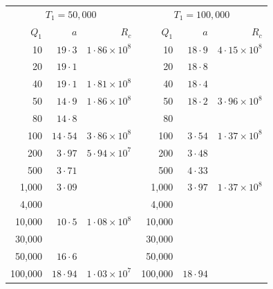 \begin{table}[p]
\bigskip
\begin{tabular}{r@{\quad}r@{\quad}r|r@{\quad}r@{\quad}r}
\hline
\multicolumn{3}{c|}{$T_1 = 50{,}000$} & \multicolumn{3}{c}{$T_1 = 100{,}000$} \\
$Q_1$ & $a$ & $R_c$ & $Q_1$ & $a$ & $R_c$ \\
\hline
 10   & $19{\cdot}3$ & $1{\cdot}86\times10^{8}$ & 10   & $18{\cdot}9$ & $4{\cdot}15\times10^{8}$\\
 20   & $19{\cdot}1$ &                          & 20   & $18{\cdot}8$ &           \\
 40   & $19{\cdot}1$ & $1{\cdot}81\times10^{8}$ & 40   & $18{\cdot}4$ &           \\
 50   & $14{\cdot}9$  & $1{\cdot}86\times10^{8}$& 50   & $18{\cdot}2$ & $3{\cdot}96\times10^{8}$\\
 80   & $14{\cdot}8$  &                         & 80   &              &           \\
 100  & $14{\cdot}54$ & $3{\cdot}86\times10^{8}$& 100  & $3{\cdot}54$ & $1{\cdot}37\times10^{8}$\\
 200  & $3{\cdot}97$ & $5{\cdot}94\times10^{7}$ & 200  & $3{\cdot}48$ &           \\
 500  & $3{\cdot}71$  &                         & 500  & $4{\cdot}33$ &           \\
 1{,}000 & $3{\cdot}09$ &                       & 1{,}000 & $3{\cdot}97$ & $1{\cdot}37\times10^{8}$\\
 4{,}000 &             &                        & 4{,}000 &              &           \\
 10{,}000 & $10{\cdot}5$ &$1{\cdot}08\times10^{8}$& 10{,}000 &            &          \\
 30{,}000 &             &                        & 30{,}000 &              &         \\
 50{,}000 & $16{\cdot}6$ &                       & 50{,}000 &              &         \\
 100{,}000 & $18{\cdot}94$ & $1{\cdot}03\times10^{7}$ & 100{,}000 & $18{\cdot}94$ & \\
\hline
\end{tabular}


\end{table}

